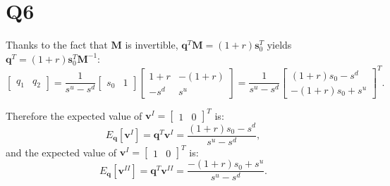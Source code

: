 \documentclass[final,3p,times]{elsarticle}
\begin{document}
\section{Q6}
	Thanks to the fact that $\mathbf{M}$ is invertible, $\mathbf{q}^T \mathbf{M}=\left(1+r\right)\mathbf{s}_0^T$ yields $\mathbf{q}^T=\left(1+r\right)\mathbf{s}_0^T \mathbf{M}^{-1}$:
	\begin{equation}
		\begin{bmatrix} q_1 & q_2 \end{bmatrix}
		=
		\frac{1}{s^u-s^d}
		\begin{bmatrix} s_0 & 1 \end{bmatrix}
		\begin{bmatrix} 1+r & -\left(1+r\right) \\ -s^d & s^u \end{bmatrix}
		=
		\frac{1}{s^u-s^d}
		\begin{bmatrix} \left(1+r\right)s_0 - s^d \\ -\left(1+r\right)s_0 + s^u \end{bmatrix}^T
		.
	\end{equation}
	
	Therefore the expected value of $\mathbf{v}^{I}=\begin{bmatrix} 1 & 0\end{bmatrix}^T$ is:
	\begin{equation}
		E_{\mathbf{q}}\left[\mathbf{v}^{I}\right]=\mathbf{q}^T \mathbf{v}^{I}
		=\frac{\left(1+r\right)s_0 - s^d}{s^u-s^d}
		,
	\end{equation}
	and the expected value of $\mathbf{v}^{I}=\begin{bmatrix} 1 & 0\end{bmatrix}^T$ is:
	\begin{equation}
		E_{\mathbf{q}}\left[\mathbf{v}^{II}\right]=\mathbf{q}^T \mathbf{v}^{II}
		=\frac{-\left(1+r\right)s_0 + s^u}{s^u-s^d}
		.
	\end{equation}


%
%
%
%	
%	
%
%
%
%
%
%
\end{document}
